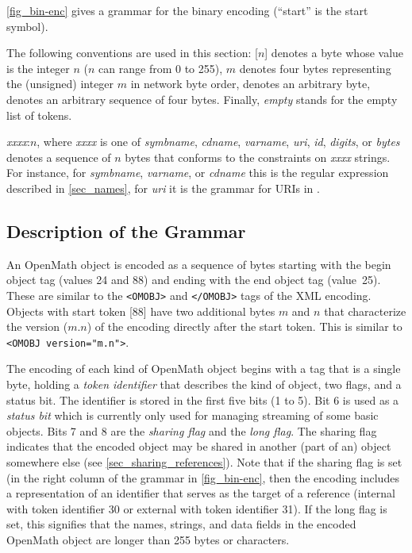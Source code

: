 \documentclass{report}
\def\textquote#1{``#1''}
\def\OM{OpenMath\xspace}
\def\XML{XML\xspace}
\begin{document}
\ref{fig_bin-enc} gives a grammar for the binary encoding (\textquote{start} is the start
symbol).

The following conventions are used in this section: [$n$] denotes a byte whose value is
the integer $n$ ($n$ can range from 0 to 255), {$m$} denotes four bytes representing the
(unsigned) integer $m$ in network byte order, \abyte denotes an arbitrary byte, \fourbytes denotes
an arbitrary sequence of four bytes.  Finally, \emph{empty} stands for the empty list of
tokens.

\emph{xxxx}:$n$, where \emph{xxxx} is one of \emph{symbname}, \emph{cdname},
\emph{varname}, \emph{uri}, \emph{id}, \emph{digits}, or \emph{bytes} denotes a sequence
of $n$ bytes that conforms to the constraints on \emph{xxxx} strings. For instance, for
\emph{symbname}, \emph{varname}, or \emph{cdname} this is the regular expression described
in \ref{sec_names}, for \emph{uri} it is the grammar for URIs in \cite{IETF2396}.

\subsection{Description of the Grammar}\label{sec_bin-desc}
  
An \OM object is encoded as a sequence of bytes starting with the begin object tag (values
24 and 88) and ending with the end object tag (value~25). These are similar to the
\lstinline|<OMOBJ>| and \lstinline|</OMOBJ>| tags of the \XML encoding. Objects with
start token [88] have two additional bytes $m$ and $n$ that characterize the version
($m.n$) of the encoding directly after the start token. This is similar to
\lstinline|<OMOBJ version="m.n">|.

The encoding of each kind of \OM object begins with a tag that is a single byte, holding a
\emph{token identifier} that describes the kind of object, two flags, and a status
bit. The identifier is stored in the first five bits (1 to 5). Bit 6 is used as a
\emph{status bit} which is currently only used for managing streaming of some basic
objects. Bits 7 and 8 are the \emph{sharing flag} and the \emph{long flag}. The sharing
flag indicates that the encoded object may be shared in another (part of an) object
somewhere else (see \ref{sec_sharing_references}). Note that if the sharing flag is set
(in the right column of the grammar in \ref{fig_bin-enc}, then the encoding includes a
representation of an identifier that serves as the target of a reference (internal with
token identifier 30 or external with token identifier 31). If the long flag is set, this
signifies that the names, strings, and data fields in the encoded \OM object are longer
than 255 bytes or characters.
\end{document}
